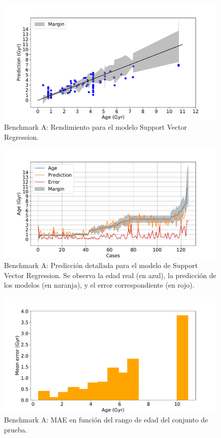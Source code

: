 \begin{figure}[H]
\begin{center}
 \includegraphics[width=0.8\linewidth]{Figuras/Experimentos/B_A_svm_1.pdf}
\end{center}
\caption{Benchmark A: Rendimiento para el modelo Support Vector Regression.}
 \label{fig:benchA_details_svm_1}
\end{figure}

\begin{figure}[H]
\begin{center}
 \includegraphics[width=0.8\linewidth]{Figuras/Experimentos/B_A_svm_2.pdf}
\end{center}
\caption{Benchmark A: Predicción detallada para el modelo de Support Vector Regression. Se observa la edad real (en azul), la predicción de los modelos (en naranja), y el error correspondiente (en rojo).}
 \label{fig:benchA_details_svm_2}
\end{figure}

\begin{figure}[H]
\begin{center}
 \includegraphics[width=0.8\linewidth]{Figuras/Experimentos/B_A_svm_3.pdf}
\end{center}
\caption{Benchmark A: MAE en función del rango de edad del conjunto de prueba.}
 \label{fig:benchA_details_svm_3}
\end{figure}

